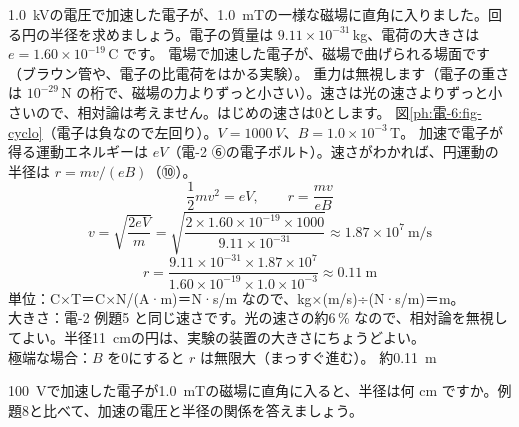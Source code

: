 \label{ph:電-6:ex8}
\begin{phreidai}[電子が磁場の中で回る半径]
\qty{1.0}{kV}の電圧で加速した電子が、\qty{1.0}{mT}の一様な磁場に直角に入りました。回る円の半径を求めましょう。電子の質量は $9.11\times10^{-31}$\,kg、電荷の大きさは $e=1.60\times10^{-19}$\,C です。
\phbamen
電場で加速した電子が、磁場で曲げられる場面です（ブラウン管や、電子の比電荷をはかる実験）。
\phmushi
重力は無視します（電子の重さは $10^{-29}$\,N の桁で、磁場の力よりずっと小さい）。速さは光の速さよりずっと小さいので、相対論は考えません。はじめの速さは0とします。
\phzu
図\ref{ph:電-6:fig-cyclo}（電子は負なので左回り）。$V=\qty{1000}{V}$、$B=1.0\times10^{-3}$\,T。
\phriyu
加速で電子が得る運動エネルギーは $eV$（電-2 ⑥の電子ボルト）。速さがわかれば、円運動の半径は $r=mv/(eB)$（⑩）。
\phtateru
\[\frac12mv^2=eV,\qquad r=\frac{mv}{eB}\]
\phtoku
\[v=\sqrt{\frac{2eV}{m}}=\sqrt{\frac{2\times1.60\times10^{-19}\times1000}{9.11\times10^{-31}}}\approx1.87\times10^7\ \text{m/s}\]
\[r=\frac{9.11\times10^{-31}\times1.87\times10^7}{1.60\times10^{-19}\times1.0\times10^{-3}}\approx0.11\ \text{m}\]
\phtashikame
単位：C×T＝C×N/(A·m)＝N·s/m なので、kg×(m/s)÷(N·s/m)＝m。\\
大きさ：電-2 例題5 と同じ速さです。光の速さの約6\,\% なので、相対論を無視してよい。半径\qty{11}{cm}の円は、実験の装置の大きさにちょうどよい。\\
極端な場合：$B$ を0にすると $r$ は無限大（まっすぐ進む）。
\kotae 約\qty{0.11}{m}
\end{phreidai}
\begin{jibun}
\qty{100}{V}で加速した電子が\qty{1.0}{mT}の磁場に直角に入ると、半径は何 cm ですか。例題8と比べて、加速の電圧と半径の関係を答えましょう。
\end{jibun}

